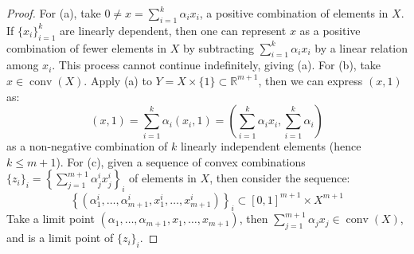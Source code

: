 \begin{proof}
	For (a), take $0\neq x=\sum_{i=1}^k\alpha_ix_i$, a positive combination of elements in $X$. If $\{x_i\}_{i=1}^k$ are linearly dependent, then one can represent $x$ as a positive combination of fewer elements in $X$ by subtracting $\sum_{i=1}^k \alpha_ix_i$ by a linear relation among $x_i$. This process cannot continue indefinitely, giving (a). For (b), take $x\in \operatorname{conv}(X)$. Apply (a) to $Y=X\times\{1\}\subset \mathbb{R}^{m+1}$, then we can express $(x,1)$ as:
	\[
		(x,1) = \sum_{i=1}^k \alpha_i (x_i,1)= \left(\sum_{i=1}^k \alpha_i x_i, \sum_{i=1}^k\alpha_i \right)
	\]
	as a non-negative combination of $k$ linearly independent elements (hence $k\leq m + 1$). For (c), given a sequence of convex combinations $\{z_i\}_i=\left\{\sum_{j=1}^{m+1}\alpha_j^ix_j^i\right\}_i$ of elements in $X$, then consider the sequence:
	\[\left\{(\alpha_1^i,\dotsc,\alpha_{m+1}^i,x_1^i,\dotsc,x_{m+1}^i)\right\}_i\subset [0,1]^{m+1}\times X^{m+1}\]
	Take a limit point $(\alpha_1,\dotsc,\alpha_{m+1},x_1,\dotsc,x_{m+1})$, then $\sum_{j=1}^{m+1} \alpha_jx_j\in \operatorname{conv}(X)$, and is a limit point of $\{z_i\}_i$.
\end{proof}

